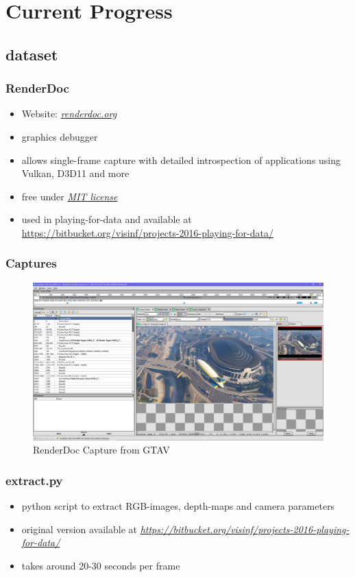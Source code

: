 \documentclass{beamer}
\begin{document}
\section{Current Progress}

\subsection{dataset}

\begin{frame}
	\frametitle{RenderDoc}
	\begin{itemize}
		\item Website: \href{https://renderdoc.org/}{\textit{renderdoc.org}}
		\item graphics debugger
		\item allows single-frame capture with detailed introspection of applications using Vulkan, D3D11 and more
		\item free under \href{https://opensource.org/licenses/MIT}{\textit{MIT license}}
		\item used in playing-for-data and available at \href{https://bitbucket.org/visinf/projects-2016-playing-for-data}{https://bitbucket.org/visinf/projects-2016-playing-for-data/}
	\end{itemize}
\end{frame}

\begin{frame}
	\frametitle{Captures}
	\begin{figure}
		\includegraphics[width=0.9\linewidth]{../images/renderdoc.PNG}
		\caption{RenderDoc Capture from GTAV}
	\end{figure}
\end{frame}

\begin{frame}
	\frametitle{extract.py}
	\begin{itemize}
		\item python script to extract RGB-images, depth-maps and camera parameters
		\item original version available at \href{https://bitbucket.org/visinf/projects-2016-playing-for-data/}{\textit{https://bitbucket.org/visinf/projects-2016-playing-for-data/}}
		\item takes around 20-30 seconds per frame
	\end{itemize}
\end{frame}
\end{document}
